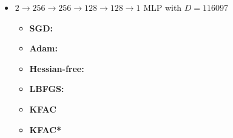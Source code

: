 \begin{itemize}
\item $2 \to 256 \to 256\to 128 \to 128 \to 1$ MLP with $D=\num{116097}$
  \begin{itemize}
    \def\pathToRuns{../kfac_pinns_exp/exp20_poisson2d_mlp_tanh_256/tex}
  \item \textbf{SGD:} 
  \item \textbf{Adam:} 
  \item \textbf{Hessian-free:} 
  \item \textbf{LBFGS:} 
  \item \textbf{KFAC} 
  \item \textbf{KFAC*} 
  \end{itemize}
\end{itemize}

